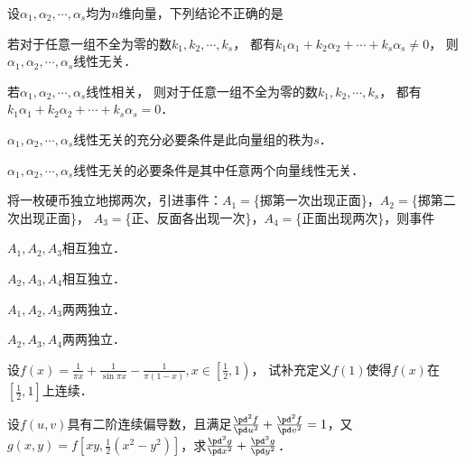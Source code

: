 \documentclass[plain,noanswer,medmath]{../../template/jnuexam}
\begin{document}
\begin{problem}
设$\alpha_1,\alpha_2, \cdots ,\alpha_s$均为$n$维向量，下列结论不正确的是\pickout{}
\begin{abcd}
\item 若对于任意一组不全为零的数$k_1,k_2, \cdots ,k_s$，
      都有$k_1\alpha_1 + k_2\alpha_2 + \cdots + k_s \alpha_s \ne 0$，
      则$\alpha_1,\alpha_2, \cdots ,\alpha_s$线性无关．
\item 若$\alpha_1,\alpha_2, \cdots ,\alpha_s$线性相关，
      则对于任意一组不全为零的数$k_1,k_2, \cdots ,k_s$，
      都有$k_1\alpha_1 + k_2\alpha_2 + \cdots + k_s \alpha_s = 0$．
\item $\alpha_1,\alpha_2, \cdots ,\alpha_s$线性无关的充分必要条件是此向量组的秩为$s$．
\item $\alpha_1,\alpha_2, \cdots ,\alpha_s$线性无关的必要条件是其中任意两个向量线性无关．
\end{abcd}
\end{problem}


\begin{problem}
将一枚硬币独立地掷两次，引进事件：$A_1=$\{掷第一次出现正面\}，$A_2=$\{掷第二次出现正面\}，
$A_3=$\{正、反面各出现一次\}，$A_4=$\{正面出现两次\}，则事件\pickout{}
\begin{abcd}
\item $A_1,A_2,A_3$相互独立．
\item $A_2,A_3,A_4$相互独立．
\item $A_1,A_2,A_3$两两独立．
\item $A_2,A_3,A_4$两两独立．
\end{abcd}
\end{problem}



\begin{problem}
设$f(x) = \frac{1}{\pi x} + \frac{1}{\sin \pi x} - \frac{1}{\pi(1 - x)},x \in\left[\frac{1}{2},1\right)$，
试补充定义$f(1)$使得$f(x)$在$\left[\frac{1}{2},1\right]$上连续．
\end{problem}



\begin{problem}
设$f(u,v)$具有二阶连续偏导数，且满足$\frac{\pd^2 f}{\pd u^2} + \frac{\pd^2 f}{\pd v^2} = 1$，又\goodbreak
$g(x,y) = f[xy,\frac{1}{2}(x^2 - y^2)]$，求$\frac{\pd^2 g}{\pd x^2} + \frac{\pd^2 g}{\pd y^2}$．
\end{problem}


\end{document}
